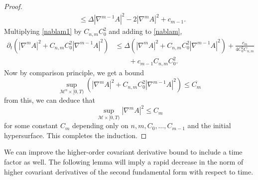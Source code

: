 \begin{proof}
\begin{align}
        & \le \Delta|\nabla^{m-1}A|^{2} - 2|\nabla^{m}A|^{2} + c_{m-1} \label{nablam1}.
    \end{align}
    Multiplying \cref{nablam1} by $ C_{n,m}C_{0}^{2} $ and adding to \cref{nablam}, \begin{align*}
        \partial_{t}\left( |\nabla^{m}A|^{2}+ C_{n,m}C_{0}^{2}|\nabla^{m-1}A|^{2} \right) & \le \Delta\left( |\nabla^{m}A|^{2}+ C_{n,m}C_{0}^{2}|\nabla^{m-1}A|^{2} \right) + \frac{c_{m}}{4C_{0}^{2}C_{n,m}} \\
        & \qquad + c_{m-1}C_{n,m}C_{0}^{2}.
    \end{align*}
    Now by comparison principle, we get a bound 
    \[ \sup_{\mathcal{M}^{n} \times [0,T)}\left( |\nabla^{m}A|^{2}+ C_{n,m}C_{0}^{2}|\nabla^{m-1}A|^{2} \right) \le \overline{C_{m}} \]
    from this, we can deduce that 
    \[ \sup_{\mathcal{M} \times [0,T)} |\nabla^{m}A|^{2} \le C_{m}\]
    for some constant $ C_{m} $ depending only on $ n,m, C_{0}, \dots, C_{m-1} $ and the initial hypersurface. This completes the induction.
\end{proof}
We can improve the higher-order covariant derivative bound to include a time factor as well. The following lemma will imply a rapid decrease in the norm of higher covariant derivatives of the second fundamental form with respect to time. 

